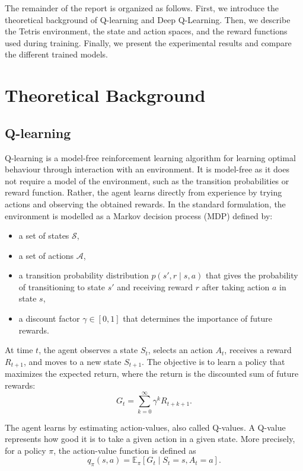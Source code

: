 \documentclass[12pt]{article}
\begin{document}
The remainder of the report is organized as follows. First, we introduce the theoretical background of Q-learning and Deep Q-Learning. Then, we describe the Tetris environment, the state and action spaces, and the reward functions used during training. Finally, we present the experimental results and compare the different trained models.

\section{Theoretical Background}

\subsection{Q-learning}

Q-learning is a model-free reinforcement learning algorithm for learning optimal behaviour through interaction with an environment. It is model-free as it does not require a model of the environment, such as the transition probabilities or reward function. Rather, the agent learns directly from experience by trying actions and observing the obtained rewards. In the standard formulation, the environment is modelled as a Markov decision process (MDP) defined by:
\begin{itemize}
    \item a set of states $\mathcal{S}$,
    \item a set of actions $\mathcal{A}$,
    \item a transition probability distribution $p(s',r \mid s,a)$ that gives the probability of transitioning to state $s'$ and receiving reward $r$ after taking action $a$ in state $s$,
    \item a discount factor $\gamma \in [0,1]$ that determines the importance of future rewards.
\end{itemize}

At time $t$, the agent observes a state $S_t$, selects an action $A_t$, receives a reward $R_{t+1}$, and moves to a new state $S_{t+1}$. The objective is to learn a policy that maximizes the expected return, where the return is the discounted sum of future rewards:
\[
G_t = \sum_{k=0}^{\infty} \gamma^k R_{t+k+1}.
\]

The agent learns by estimating action-values, also called Q-values. A Q-value represents how good it is to take a given action in a given state. More precisely, for a policy $\pi$, the action-value function is defined as 
\[
q_{\pi}(s,a) =
\mathbb{E}_{\pi}\left[G_t \mid S_t=s, A_t=a\right].
\]
\end{document}

